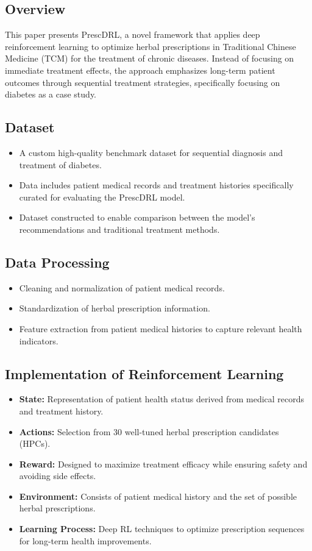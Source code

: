 \subsection*{Overview}
This paper presents PrescDRL, a novel framework that applies deep reinforcement learning to optimize herbal prescriptions in Traditional Chinese Medicine (TCM) for the treatment of chronic diseases. Instead of focusing on immediate treatment effects, the approach emphasizes long-term patient outcomes through sequential treatment strategies, specifically focusing on diabetes as a case study.

\subsection*{Dataset}
\begin{itemize}
    \item A custom high-quality benchmark dataset for sequential diagnosis and treatment of diabetes.
    \item Data includes patient medical records and treatment histories specifically curated for evaluating the PrescDRL model.
    \item Dataset constructed to enable comparison between the model's recommendations and traditional treatment methods.
\end{itemize}

\subsection*{Data Processing}
\begin{itemize}
    \item Cleaning and normalization of patient medical records.
    \item Standardization of herbal prescription information.
    \item Feature extraction from patient medical histories to capture relevant health indicators.
\end{itemize}

\subsection*{Implementation of Reinforcement Learning}
\begin{itemize}
    \item \textbf{State:} Representation of patient health status derived from medical records and treatment history.
    \item \textbf{Actions:} Selection from 30 well-tuned herbal prescription candidates (HPCs).
    \item \textbf{Reward:} Designed to maximize treatment efficacy while ensuring safety and avoiding side effects.
    \item \textbf{Environment:} Consists of patient medical history and the set of possible herbal prescriptions.
    \item \textbf{Learning Process:} Deep RL techniques to optimize prescription sequences for long-term health improvements.
\end{itemize}

